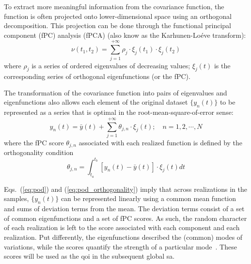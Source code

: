 To extract more meaningful information from the covariance function, the function is often projected onto lower-dimensional space using an orthogonal decomposition.
This projection can be done through the functional principal component (fPC) analysis (fPCA) (also know as the Karhunen-Lo\'eve transform):
\begin{equation}
	\nu (t_1, t_2) = \sum_{j=1}^{+\infty} \rho_j \cdot \xi_j(t_1) \cdot \xi_j(t_2)
\label{eq:kl_transform}
\end{equation}
where $\rho_j$ is a series of ordered eigenvalues of decreasing values; 
$\xi_j(t)$ is the corresponding series of orthogonal eigenfunctions (or the fPC).

The transformation of the covariance function into pairs of eigenvalues and eigenfunctions also allows each element of the original dataset $\{y_n(t)\}$ to be represented as a series that is optimal in the root-mean-square-of-error sense:
\begin{equation}
  y_n(t) = \bar{y}(t) + \sum_{j=1}^{+\infty} \theta_{j,n} \cdot \xi_j (t); \quad n = 1, 2, \cdots, N
\label{eq:pod}
\end{equation}
where the fPC score $\theta_{j,n}$ associated with each realized function is defined by the orthogonality condition
\begin{equation}
  \theta_{j,n} = \int_{t_a}^{t_b} \left[y_n(t) - \bar{y}(t)\right] \cdot \xi_j (t) dt
\label{eq:pod_orthogonality}
\end{equation}

Eqs.~(\ref{eq:pod}) and (\ref{eq:pod_orthogonality}) imply that across realizations in the samples, 
$\{y_n(t)\}$ can be represented linearly using a common mean function and sums of deviation terms from the mean.
The deviation terms consist of a set of common eigenfunctions and a set of fPC scores.
As such, the random character of each realization is left to the score associated with each component and each realization.
Put differently, the eigenfunctions described the (common) modes of variations, 
while the scores quantify the strength of a particular mode~\cite{Wang2012}.
These scores will be used as the \gls{qoi} in the subsequent global \gls{sa}.